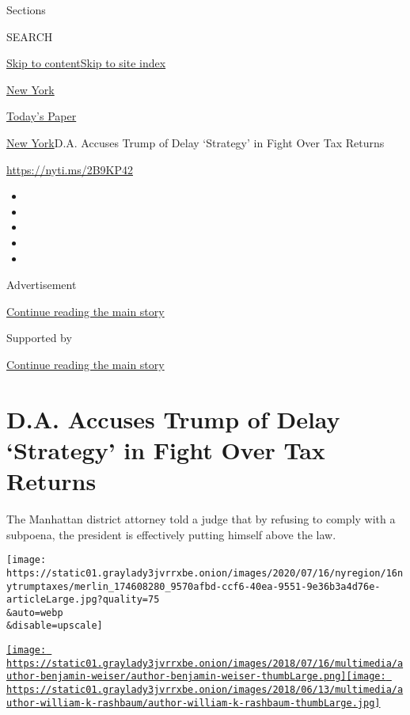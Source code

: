 Sections

SEARCH

\protect\hyperlink{site-content}{Skip to
content}\protect\hyperlink{site-index}{Skip to site index}

\href{https://www.nytimes3xbfgragh.onion/section/nyregion}{New York}

\href{https://myaccount.nytimes3xbfgragh.onion/auth/login?response_type=cookie\&client_id=vi}{}

\href{https://www.nytimes3xbfgragh.onion/section/todayspaper}{Today's
Paper}

\href{/section/nyregion}{New York}\textbar{}D.A. Accuses Trump of Delay
`Strategy' in Fight Over Tax Returns

\url{https://nyti.ms/2B9KP42}

\begin{itemize}
\item
\item
\item
\item
\item
\end{itemize}

Advertisement

\protect\hyperlink{after-top}{Continue reading the main story}

Supported by

\protect\hyperlink{after-sponsor}{Continue reading the main story}

\hypertarget{da-accuses-trump-of-delay-strategy-in-fight-over-tax-returns}{%
\section{D.A. Accuses Trump of Delay `Strategy' in Fight Over Tax
Returns}\label{da-accuses-trump-of-delay-strategy-in-fight-over-tax-returns}}

The Manhattan district attorney told a judge that by refusing to comply
with a subpoena, the president is effectively putting himself above the
law.

\texttt{[image: https://static01.graylady3jvrrxbe.onion/images/2020/07/16/nyregion/16nytrumptaxes/merlin\_174608280\_9570afbd-ccf6-40ea-9551-9e36b3a4d76e-articleLarge.jpg?quality=75\\\&auto=webp\\\&disable=upscale]}

\href{https://www.nytimes3xbfgragh.onion/by/benjamin-weiser}{\texttt{[image: https://static01.graylady3jvrrxbe.onion/images/2018/07/16/multimedia/author-benjamin-weiser/author-benjamin-weiser-thumbLarge.png]}}\href{https://www.nytimes3xbfgragh.onion/by/william-k-rashbaum}{\texttt{[image: https://static01.graylady3jvrrxbe.onion/images/2018/06/13/multimedia/author-william-k-rashbaum/author-william-k-rashbaum-thumbLarge.jpg]}}

